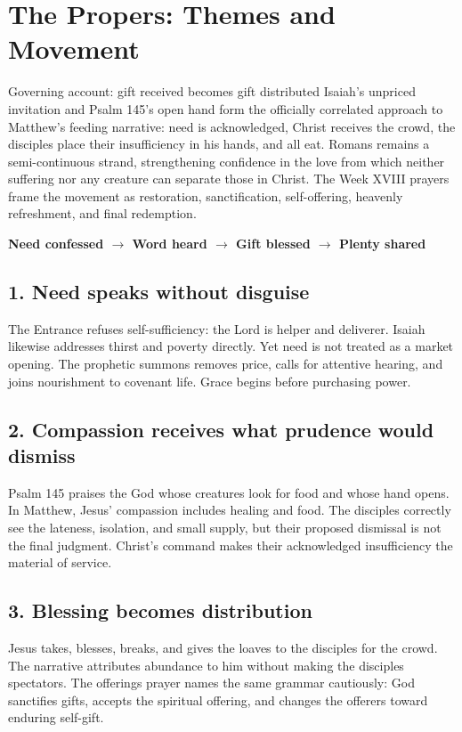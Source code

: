 \section*{The Propers: Themes and Movement}
\label{triptych:brief-synthesis:start}
\begin{massbox}{Governing account: gift received becomes gift distributed}
Isaiah's unpriced invitation and Psalm 145's open hand form the officially correlated approach to Matthew's feeding narrative: need is acknowledged, Christ receives the crowd, the disciples place their insufficiency in his hands, and all eat. Romans remains a semi-continuous strand, strengthening confidence in the love from which neither suffering nor any creature can separate those in Christ. The Week XVIII prayers frame the movement as restoration, sanctification, self-offering, heavenly refreshment, and final redemption.
\end{massbox}
\begin{center}
\textbf{Need confessed $\longrightarrow$ Word heard $\longrightarrow$ Gift blessed $\longrightarrow$ Plenty shared}
\end{center}

\subsection*{1. Need speaks without disguise\enspace{}}
The Entrance refuses self-sufficiency: the Lord is helper and deliverer. Isaiah likewise addresses thirst and poverty directly. Yet need is not treated as a market opening. The prophetic summons removes price, calls for attentive hearing, and joins nourishment to covenant life. Grace begins before purchasing power.

\subsection*{2. Compassion receives what prudence would dismiss\enspace{}}
Psalm 145 praises the God whose creatures look for food and whose hand opens. In Matthew, Jesus' compassion includes healing and food. The disciples correctly see the lateness, isolation, and small supply, but their proposed dismissal is not the final judgment. Christ's command makes their acknowledged insufficiency the material of service.

\subsection*{3. Blessing becomes distribution\enspace{}}
Jesus takes, blesses, breaks, and gives the loaves to the disciples for the crowd. The narrative attributes abundance to him without making the disciples spectators. The offerings prayer names the same grammar cautiously: God sanctifies gifts, accepts the spiritual offering, and changes the offerers toward enduring self-gift.

